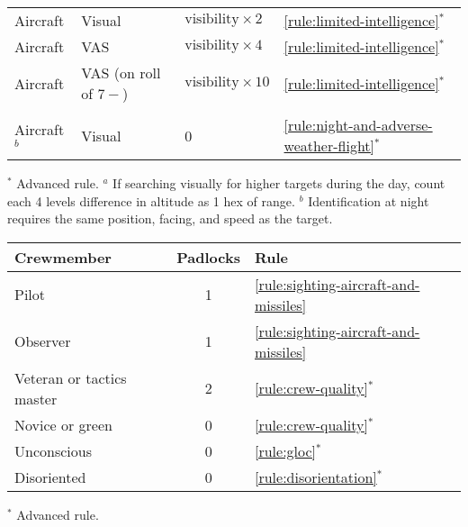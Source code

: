 {\begin{twocolumntablefloat}
\begin{twocolumntable}
\begin{tabularx}{0.7\linewidth}{llLl}
Aircraft&Visual&$\mbox{visibility} \times 2$&\ref{rule:limited-intelligence}$^*$\\
Aircraft&VAS&$\mbox{visibility} \times 4$&\ref{rule:limited-intelligence}$^*$\\
Aircraft&VAS (on roll of $7-$)&$\mbox{visibility} \times 10$&\ref{rule:limited-intelligence}$^*$\\
\midrule
{}\\
\midrule
Aircraft$^b$&Visual&0&\ref{rule:night-and-adverse-weather-flight}$^*$\\
\bottomrule
\end{tabularx}
\begin{tablenote}{0.7\linewidth}
$^*$ Advanced rule. $^a$ If searching visually for higher targets during the day, count each 4 levels difference in altitude as 1 hex of range. $^b$ Identification at night requires the same position, facing, and speed as the target. 
\end{tablenote}
\end{twocolumntable}

\vspace{\floatsep}

\begin{onecolumntable}
\small
{}
\begin{tabularx}{0.8\linewidth}{Xcl}
\toprule
Crewmember&Padlocks&Rule\\
\midrule
Pilot&1&\ref{rule:sighting-aircraft-and-missiles}\\
Observer&1&\ref{rule:sighting-aircraft-and-missiles}\\
\midrule
Veteran or tactics master&2&\ref{rule:crew-quality}$^*$\\
Novice or green&0&\ref{rule:crew-quality}$^*$\\
Unconscious&0&\ref{rule:gloc}$^*$\\
Disoriented&0&\ref{rule:disorientation}$^*$\\
\bottomrule
\end{tabularx}
\begin{tablenote}{0.8\linewidth}
$^*$ Advanced rule.
\end{tablenote}
\end{onecolumntable}

\end{twocolumntablefloat}





}
